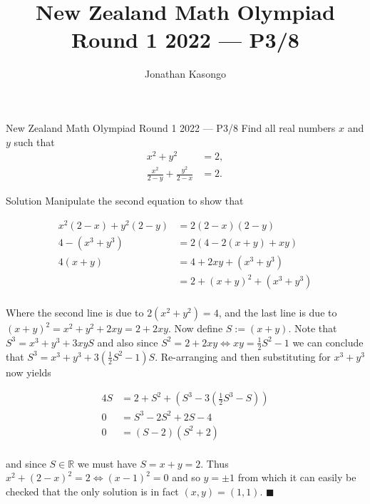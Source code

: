 \documentclass{article}
\author{Jonathan Kasongo}
\title{New Zealand Math Olympiad Round 1 2022 --- P3/8}
\begin{document}
\maketitle

\begin{problem}{New Zealand Math Olympiad Round 1 2022 --- P3/8}
Find all real numbers \(x\) and \(y\) such that
\begin{align*}
x^2 + y^2 &= 2,\\
\frac{x^2}{2-y} + \frac{y^2}{2-x} &= 2.
\end{align*}
\end{problem}

\begin{solution}{Solution}
Manipulate the second equation to show that

\[
\begin{aligned}
x^2(2-x) + y^2(2-y) &= 2(2-x)(2-y)\\
4 - (x^3 + y^3) &= 2(4 - 2(x+y) + xy)\\
4(x+y) &= 4 + 2xy + (x^3 + y^3)\\
&= 2 + (x+y)^2 + (x^3 + y^3)\\
\end{aligned}
\]

Where the second line is due to $2(x^2 + y^2) = 4$, and the last line is
due to $(x+y)^2 = x^2 + y^2 + 2xy = 2 + 2xy$. Now define $S := (x + y)$.
Note that $S^3 = x^3 + y^3 + 3xyS$ and also since $S^2 = 2 + 2xy \iff
xy = \frac{1}{2}S^2 - 1$ we can conclude that
$S^3 = x^3 + y^3 + 3\left(\frac{1}{2}S^2 - 1\right)S$. Re-arranging and
then substituting for $x^3 + y^3$ now yields

\[
\begin{aligned}
4S &= 2 + S^2 + \left(S^3 - 3\left(\frac{1}{2}S^3 - S\right)\right)\\
0 &= S^3 - 2S^2 + 2S - 4\\
0 &= (S-2)(S^2 + 2)\\
\end{aligned}
\]

and since $S \in \mathbb{R}$ we must have $S = x + y = 2$. Thus
$x^2 + (2-x)^2 = 2 \iff (x-1)^2 = 0$ and so $y = \pm 1$ from which it can
easily be checked that the only solution is in fact $(x, y) = (1, 1)$.
$\blacksquare$
\end{solution}
\end{document}
